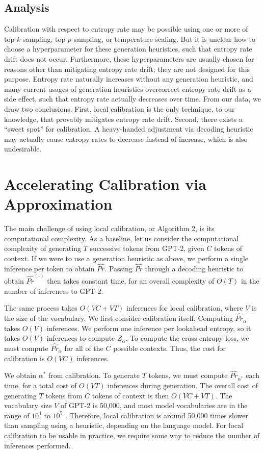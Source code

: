 \documentclass[pageno]{jpaper}
\begin{document}
\subsection{Analysis}

Calibration with respect to entropy rate may be possible using one or more of top-$k$ sampling, top-$p$ sampling, or temperature scaling. But it is unclear how to choose a hyperparameter for these generation heuristics, such that entropy rate drift does not occur. Furthermore, these hyperparameters are usually chosen for reasons other than mitigating entropy rate drift; they are not designed for this purpose. Entropy rate naturally increases without any generation heuristic, and many current usages of generation heuristics overcorrect entropy rate drift as a side effect, such that entropy rate actually decreases over time. From our data, we draw two conclusions. First, local calibration is the only technique, to our knowledge, that provably mitigates entropy rate drift. Second, there exists a ``sweet spot'' for calibration. A heavy-handed adjustment via decoding heuristic may actually cause entropy rates to decrease instead of increase, which is also undesirable.

\section{Accelerating Calibration via Approximation}

The main challenge of using local calibration, or Algorithm 2, is its computational complexity. As a baseline, let us consider the computational complexity of generating $T$ successive tokens from GPT-2, given $C$ tokens of context. If we were to use a generation heuristic as above, we perform a single inference per token to obtain $\widehat{Pr}$. Passing $\widehat{Pr}$ through a decoding heuristic to obtain $\widehat{Pr}^{(\cdot)}$ then takes constant time, for an overall complexity of $O(T)$ in the number of inferences to GPT-2.

The same process takes $O(VC + VT)$ inferences for local calibration, where $V$ is the size of the vocabulary. We first consider calibration itself. Computing $\widehat{Pr}_\alpha$ takes $O(V)$ inferences. We perform one inference per lookahead entropy, so it takes $O(V)$ inferences to compute $Z_\alpha$. To compute the cross entropy loss, we must compute $\widehat{Pr}_\alpha$ for all of the $C$ possible contexts. Thus, the cost for calibration is $O(VC)$ inferences.

We obtain $\alpha^*$ from calibration. To generate $T$ tokens, we must compute $\widehat{Pr}_{\alpha^*}$ each time, for a total cost of $O(VT)$ inferences during generation. The overall cost of generating $T$ tokens from $C$ tokens of context is then $O(VC+VT)$. The vocabulary size $V$ of GPT-2 is 50,000, and most model vocabularies are in the range of $10^4$ to $10^5$ \cite{radford2019language,attention17}. Therefore, local calibration is around 50,000 times slower than sampling using a heuristic, depending on the language model. For local calibration to be usable in practice, we require some way to reduce the number of inferences performed. 
\end{document}
